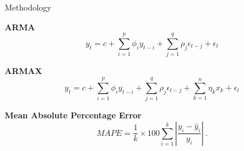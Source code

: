 \documentclass[t,xcolor={table},fleqn]{beamer}
\begin{document}
\begin{frame}{Methodology}

\textbf{ARMA}
\begin{equation}
y_t = c+\sum_{i=1}^{p}\phi_iy_{t-i}+\sum_{j=1}^{q}\rho_j\epsilon_{t-j}+\epsilon_t
\end{equation}

\textbf{ARMAX}
\begin{equation}
y_t = c+\sum_{i=1}^{p}\phi_iy_{t-i}+\sum_{j=1}^{q}\rho_j\epsilon_{t-j}+\sum_{k=1}^{n}\eta_kx_k+\epsilon_t
\end{equation}

\textbf{Mean Absolute Percentage Error}
\begin{equation}
MAPE = \frac{1}{k}\times 100 \sum_{i=1}^{k} \left|\frac{y_i-\hat{y}_i}{y_i}\right|~.
\end{equation}

\end{frame}
\end{document}
